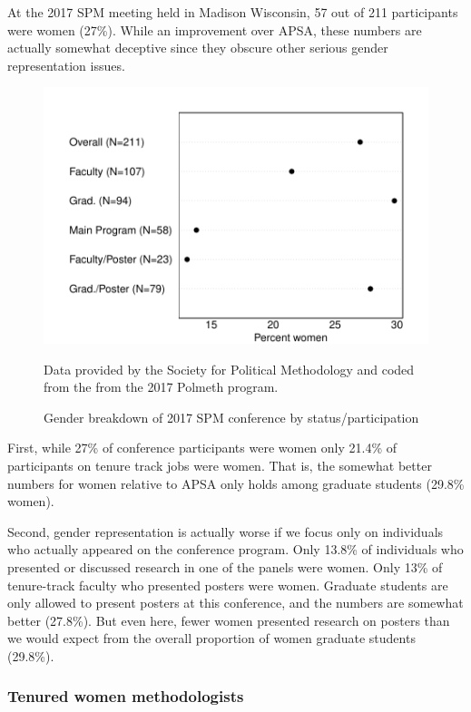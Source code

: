 \documentclass[12pt]{texMemo}
\begin{document}
At the 2017 SPM meeting held in Madison Wisconsin, 57 out of 211 participants were women (27\%).  While an improvement over APSA, these numbers are actually somewhat deceptive since they obscure other serious gender representation issues.   
\begin{figure}[htbp]
\caption{Gender breakdown of 2017 SPM conference by status/participation }
\begin{center}
\includegraphics[scale=.8]{polmeth}
\end{center}


\footnotesize Data provided by the Society for Political Methodology and coded from the from the 2017 Polmeth program.
\end{figure}
First, while 27\% of conference participants were women only 21.4\% of participants on tenure track jobs were women.  That is, the somewhat better numbers for women relative to APSA only holds among graduate students (29.8\% women).  

Second, gender representation is actually worse if we focus only on individuals who actually appeared on the conference program.  Only 13.8\% of individuals who presented or discussed research in one of the panels were women.  Only 13\% of tenure-track faculty who presented posters were women.  Graduate students are only allowed to present posters at this conference, and the numbers are somewhat better (27.8\%).  But even here, fewer women presented research on posters than we would expect from the overall proportion of women graduate students (29.8\%).

\newpage

\subsubsection*{Tenured women methodologists}
\end{document}
